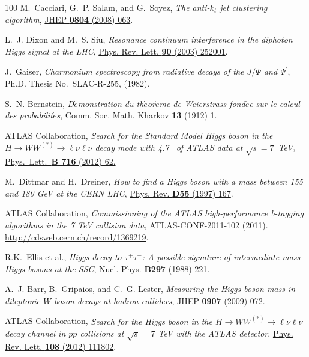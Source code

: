 \documentclass[final,3p,times,twocolumn]{elsarticle}
\begin{document}
\begin{thebibliography}{100}
M.~Cacciari, G.~P. Salam, and G.~Soyez, {\em {The anti-$k_t$ jet clustering
  algorithm}}, \href{http://dx.doi.org/10.1088/1126-6708/2008/04/063}{JHEP
  {\bfseries 0804} (2008) 063}.

L.~J. Dixon and M.~S. Siu, {\em {Resonance continuum interference in the
  diphoton Higgs signal at the LHC}},
  \href{http://dx.doi.org/10.1103/PhysRevLett.90.252001}{Phys. Rev. Lett.
  {\bfseries 90} (2003) 252001}.

J.~Gaiser, {\em Charmonium spectroscopy from radiative decays of the $J/\Psi$
  and $\Psi^{\prime}$}, Ph.D. Thesis No.~SLAC-R-255, (1982).

S.~N. Bernstein, {\em {D$\acute{e}$monstration du th$\acute{e}$or$\grave{e}$me
  de Weierstrass fond$\acute{e}$e sur le calcul des probabilit$\acute{e}$s}},
  Comm. Soc. Math. Kharkov {\bfseries 13} (1912) 1.

{ATLAS} Collaboration, {\em {Search for the Standard Model Higgs boson in the
  $H\to WW^{(\ast)}\to \ell\nu\ell\nu$ decay mode with 4.7~\ifb{} of ATLAS data
  at $\sqrt{s} = 7$~TeV}}, \href{http://dx.doi.org/10.1016/j.physletb.2012.08.010}
  {Phys.~Lett.~{\bfseries B 716} (2012) 62.}

M.~Dittmar and H.~Dreiner, {\em How to find a Higgs boson with a mass between
  155 and 180 GeV at the CERN LHC},
  \href{http://dx.doi.org/10.1103/PhysRevD.55.167}{Phys. Rev. {\bfseries D55}
  (1997) 167}.

{ATLAS Collaboration}, {\em {Commissioning of the ATLAS high-performance
  b-tagging algorithms in the 7 TeV collision data}}, ATLAS-CONF-2011-102
  (2011). \url{http://cdsweb.cern.ch/record/1369219}.

{R.K.~Ellis et al.}, {\em {Higgs decay to $\tau^{+}\tau^{-}$: A possible
  signature of intermediate mass Higgs bosons at the SSC}},
  \href{http://dx.doi.org/10.1016/0550-3213(88)90019-3}{Nucl. Phys. {\bfseries
  B297} (1988) 221}.

A.~J. Barr, B.~Gripaios, and C.~G. Lester, {\em {Measuring the Higgs boson mass
  in dileptonic $W$-boson decays at hadron colliders}},
  \href{http://dx.doi.org/10.1088/1126-6708/2009/07/072}{JHEP {\bfseries 0907}
  (2009) 072}.

{ATLAS Collaboration}, {\em {Search for the Higgs boson in the $H\to
  WW^{(*)}\to \ell\nu\ell\nu$ decay channel in $pp$ collisions at $\sqrt{s} =
  7$ TeV with the ATLAS detector}},
  \href{http://dx.doi.org/10.1103/PhysRevLett.108.111802}{Phys. Rev. Lett.
  {\bfseries 108} (2012) 111802}.


\end{thebibliography}
\end{document}

